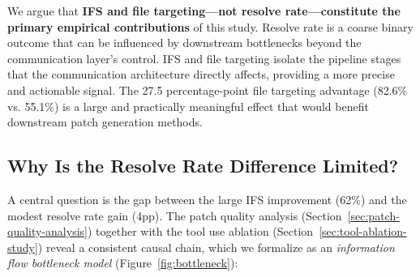 \documentclass{ieeeaccess}
\begin{document}
We argue that \textbf{IFS and file targeting---not resolve rate---constitute the primary empirical contributions} of this study. Resolve rate is a coarse binary outcome that can be influenced by downstream bottlenecks beyond the communication layer's control. IFS and file targeting isolate the pipeline stages that the communication architecture directly affects, providing a more precise and actionable signal. The 27.5 percentage-point file targeting advantage (82.6\% vs. 55.1\%) is a large and practically meaningful effect that would benefit downstream patch generation methods.

\subsection{Why Is the Resolve Rate Difference Limited?}
\label{sec:resolve-rate-limited}

A central question is the gap between the large IFS improvement (62\%) and the modest resolve rate gain (4pp). The patch quality analysis (Section~\ref{sec:patch-quality-analysis}) together with the tool use ablation (Section~\ref{sec:tool-ablation-study}) reveal a consistent causal chain, which we formalize as an \emph{information flow bottleneck model} (Figure~\ref{fig:bottleneck}):
\end{document}
